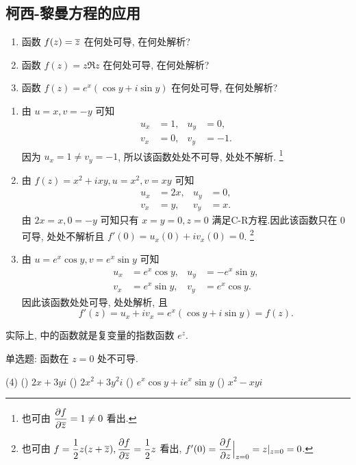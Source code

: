 \subsection{柯西-黎曼方程的应用}

\begin{example}
  \begin{enumerate}
    \item 函数 $f(z)=\overline z$ 在何处可导, 在何处解析?
    \item 函数 $f(z)=z\Re z$ 在何处可导, 在何处解析?
    \item 函数 $f(z)=e^x(\cos y+i\sin y)$ 在何处可导, 在何处解析?
  \end{enumerate}
\end{example}
\begin{solution}
  \begin{enumerate}
    \item 由 $u=x,v=-y$ 可知
      \begin{align*}
        u_x&=1,&u_y&=0,\\
        v_x&=0,&v_y&=-1.
      \end{align*}
    因为 $u_x=1\neq v_y=-1$, 所以该函数处处不可导, 处处不解析.
    \footnote{也可由 $\dfrac{\partial f}{\partial \overline z}=1\neq0$ 看出.}
    \item 由 $f(z)=x^2+ixy,u=x^2,v=xy$ 可知
      \begin{align*}
        u_x&=2x,&u_y&=0,\\
        v_x&=y, &v_y&=x.
      \end{align*}
    由 $2x=x,0=-y$ 可知只有 $x=y=0,z=0$ 满足C-R方程.因此该函数只在 $0$ 可导, 处处不解析且 $f'(0)=u_x(0)+iv_x(0)=0$.
    \footnote{也可由 $f=\dfrac12 z(z+\overline z), \dfrac{\partial f}{\partial \overline z}=\dfrac12 z$ 看出, $f'(0)=\dfrac{\partial f}{\partial z}\Big|_{z=0}=z|_{z=0}=0$.}
    \item 由 $u=e^x\cos y,v=e^x\sin y$ 可知
      \begin{align*}
        u_x&=e^x\cos y,&u_y&=-e^x\sin y,\\
        v_x&=e^x\sin y,&v_y&=e^x\cos y.
      \end{align*}
    因此该函数处处可导, 处处解析, 且
      \[f'(z)=u_x+iv_x=e^x(\cos y+i\sin y)=f(z).\]
  \end{enumerate}
\end{solution}

实际上,  中的函数就是复变量的指数函数 $e^z$.

\begin{exercise}
	单选题: 函数\fillbrace{}在 $z=0$ 处不可导.
	\begin{taskschoice}(4)
		() $2x+3yi$
		() $2x^2+3y^2i$
		() $e^x\cos y+i e^x\sin y$
		() $x^2-xyi$
	\end{taskschoice}
\end{exercise}

